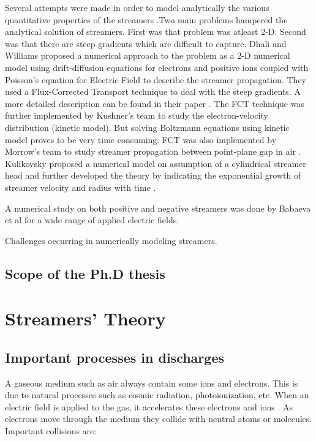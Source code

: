 Several attempts were made in order to model analytically the various quantitative properties of the streamers \cite{Davies, Davies, Evans, 1971}.Two main problems hampered the analytical solution of streamers. First was that problem was atleast 2-D. Second was that there are steep gradients which are difficult to capture. Dhali and Williams proposed a numerical approach to the problem as a 2-D numerical model using drift-diffusion equations for electrons and positive ions coupled with Poisson's equation for Electric Field to describe the streamer propagation. They used a Flux-Corrected Transport technique to deal with the steep gradients. A more detailed description can be found in their paper \cite{Dhalli 1987}. The FCT technique was further implemented by Kushner's team \cite{Kushner et al 1989} to study the electron-velocity distribution (kinetic model). But solving Boltzmann equations using kinetic model proves to be very time consuming. FCT was also implemented by Morrow's team to study streamer propagation between point-plane gap in air \cite{Morrow et al, 1997}. Kulikovsky proposed a numerical model on assumption of a cylindrical streamer head \cite{Kulikovsky 1994} and further developed the theory by indicating the exponential growth of streamer velocity and radius with time \cite{KuliKovsky 1997}. 



A numerical study on both positive and negative streamers was done by Babaeva et al \cite{Babaeva et al 1997} for a wide range of applied electric fields.     




Challenges occurring in numerically modeling streamers.


\section{Scope of the Ph.D thesis}




\chapter{Streamers' Theory}

\section{Important processes in discharges}
A gaseous medium such as air always contain some ions and electrons. This is due to natural processes such as cosmic radiation, photoionization, etc. When an electric field is applied to the gas, it accelerates these electrons and ions . As electrons move through the medium they collide with neutral atoms or molecules. Important collisions are:

